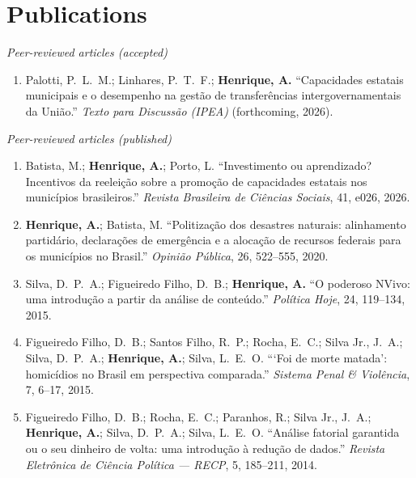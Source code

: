 \documentclass[11pt]{article}
\newcommand{\cvsubsection}[1]{\vspace{0.9em}\textit{#1}\par\vspace{0.35em}}
\begin{document}
\section{Publications}
\cvsubsection{Peer-reviewed articles (accepted)}
\begin{enumerate}[leftmargin=0.3in,itemsep=0.4em,parsep=0pt]
\item Palotti, P.\ L.\ M.; Linhares, P.\ T.\ F.; \textbf{Henrique, A.} ``Capacidades estatais municipais e o desempenho na gestão de transferências intergovernamentais da União.'' \textit{Texto para Discussão (IPEA)} (forthcoming, 2026).
\end{enumerate}

\cvsubsection{Peer-reviewed articles (published)}
\begin{enumerate}[leftmargin=0.3in,itemsep=0.4em,parsep=0pt]
\item Batista, M.; \textbf{Henrique, A.}; Porto, L. ``Investimento ou aprendizado? Incentivos da reeleição sobre a promoção de capacidades estatais nos municípios brasileiros.'' \textit{Revista Brasileira de Ciências Sociais}, 41, e026, 2026.
\item \textbf{Henrique, A.}; Batista, M. ``Politização dos desastres naturais: alinhamento partidário, declarações de emergência e a alocação de recursos federais para os municípios no Brasil.'' \textit{Opinião Pública}, 26, 522--555, 2020.
\item Silva, D.\ P.\ A.; Figueiredo Filho, D.\ B.; \textbf{Henrique, A.} ``O poderoso NVivo: uma introdução a partir da análise de conteúdo.'' \textit{Política Hoje}, 24, 119--134, 2015.
\item Figueiredo Filho, D.\ B.; Santos Filho, R.\ P.; Rocha, E.\ C.; Silva Jr., J.\ A.; Silva, D.\ P.\ A.; \textbf{Henrique, A.}; Silva, L.\ E.\ O. ```Foi de morte matada': homicídios no Brasil em perspectiva comparada.'' \textit{Sistema Penal \& Violência}, 7, 6--17, 2015.
\item Figueiredo Filho, D.\ B.; Rocha, E.\ C.; Paranhos, R.; Silva Jr., J.\ A.; \textbf{Henrique, A.}; Silva, D.\ P.\ A.; Silva, L.\ E.\ O. ``Análise fatorial garantida ou o seu dinheiro de volta: uma introdução à redução de dados.'' \textit{Revista Eletrônica de Ciência Política --- RECP}, 5, 185--211, 2014.
\end{enumerate}
\end{document}
